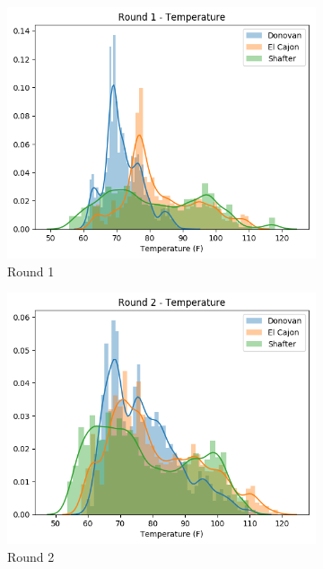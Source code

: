 \documentclass[journal abbreviation, manuscript]{copernicus}
\begin{document}
\begin{figure}[H]
\centering
\begin{subfigure}{0.32\textwidth}
\includegraphics[width=\textwidth]{results/distributions/round1_temperature.png}
\caption{Round 1}
\end{subfigure}
\begin{subfigure}{0.32\textwidth}
\includegraphics[width=\textwidth]{results/distributions/round2_temperature.png}
\caption{Round 2}
\end{subfigure}
\begin{subfigure}{0.32\textwidth}

\end{subfigure}
\end{figure}
\end{document}
